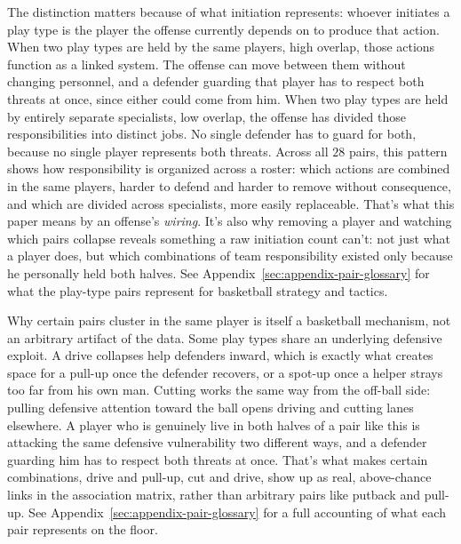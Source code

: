 \documentclass[11pt]{article}
\begin{document}
The distinction matters because of what initiation represents: whoever initiates a play type
is the player the offense currently depends on to produce that action. When two play types are
held by the same players, high overlap, those actions function as a linked system. The offense
can move between them without changing personnel, and a defender guarding that player has to
respect both threats at once, since either could come from him. When two play types are held
by entirely separate specialists, low overlap, the offense has divided those responsibilities
into distinct jobs. No single defender has to guard for both, because no single player
represents both threats.
Across all $28$ pairs, this pattern shows how responsibility is organized across a roster:
which actions are combined in the same players, harder to defend and harder to remove without
consequence, and which are divided across specialists, more easily replaceable. That's what
this paper means by an offense's \emph{wiring}. It's also why removing a player and watching
which pairs collapse reveals something a raw initiation count can't: not just what a player
does, but which combinations of team responsibility existed only because he personally held
both halves. See Appendix~\ref{sec:appendix-pair-glossary} for what the play-type pairs
represent for basketball strategy and tactics.

Why certain pairs cluster in the same player is itself a basketball mechanism, not an
arbitrary artifact of the data. Some play types share an underlying defensive exploit. A drive
collapses help defenders inward, which is exactly what creates space for a pull-up once the
defender recovers, or a spot-up once a helper strays too far from his own man. Cutting works
the same way from the off-ball side: pulling defensive attention toward the ball opens driving
and cutting lanes elsewhere. A player who is genuinely live in both halves of a pair like this
is attacking the same defensive vulnerability two different ways, and a defender guarding him
has to respect both threats at once. That's what makes certain combinations, drive and
pull-up, cut and drive, show up as real, above-chance links in the association matrix, rather
than arbitrary pairs like putback and pull-up. See
Appendix~\ref{sec:appendix-pair-glossary} for a full accounting of what each pair represents
on the floor.
\end{document}
